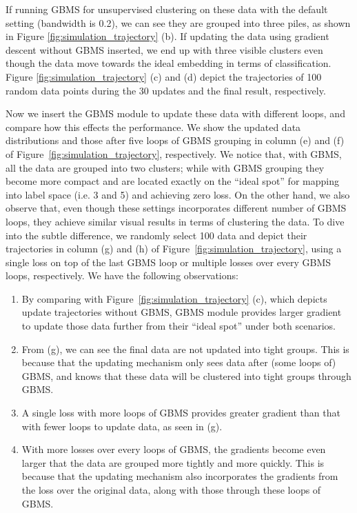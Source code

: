 If running GBMS for unsupervised clustering on these data with the default setting (bandwidth is 0.2),
we can see they are grouped into three piles,
as shown in Figure \ref{fig:simulation_trajectory} (b).
If updating the data using gradient descent without GBMS inserted,
we end up with three visible clusters even though the data move towards the ideal embedding in terms of classification.
Figure \ref{fig:simulation_trajectory} (c) and (d) depict the trajectories of 100 random data points during the 30 updates and the final result, respectively.


Now we insert the GBMS module to update these data with different loops,
and compare how this effects the performance.
We show the updated data distributions and those after five loops of GBMS grouping in column (e) and (f) of Figure~\ref{fig:simulation_trajectory},
respectively.
We notice that, with GBMS,
all the data are grouped into two clusters;
while with GBMS grouping they become more compact and are located exactly on
the ``ideal spot'' for mapping into label space (i.e. 3 and 5) and achieving
zero loss.
On the other hand,
we also observe that, even though these settings incorporates different number of GBMS loops,
they achieve similar visual results in terms of clustering the data.
To dive into the subtle difference,
we randomly select 100 data and depict their trajectories in column (g) and (h)
of Figure~\ref{fig:simulation_trajectory},
using a single loss on top of the last GBMS loop or multiple losses over every GBMS loops,
respectively.
We have the following observations:
\begin{enumerate}
  \item By comparing with Figure~\ref{fig:simulation_trajectory} (c),
    which depicts update trajectories without GBMS,
    GBMS module provides larger gradient to update those data further from their ``ideal spot'' under both scenarios.
  \item From (g),
    we can see the final data are not updated into tight groups.
    This is because that the updating mechanism only sees data after (some loops of) GBMS,
    and knows that these data will be clustered into tight groups through GBMS.
  \item A single loss with more loops of GBMS provides greater gradient than that with fewer loops to update data, as seen in (g).
  \item With more losses over every loops of GBMS,
    the gradients become even larger that the data are grouped more tightly and more quickly.
    This is because that the updating mechanism also incorporates the gradients from the loss over the original data,
    along with those through these loops of GBMS.
\end{enumerate}

